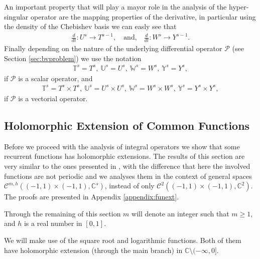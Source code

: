 \documentclass{article}
\newcommand{\IC}{{\mathbb C}}
\newcommand{\IU}{{\mathbb U}}
\newcommand{\IT}{{\mathbb T}}
\newcommand{\IW}{{\mathbb W}}
\newcommand{\IY}{{\mathbb Y}}
\newcommand{\cmspace}[3]{\mathcal{C}^{#1} \left( #2, #3 \right)}
\newcommand{\cmspaceh}[4]{\mathcal{C}^{#1,#2} \left( #3, #4 \right)}
\newcommand{\cP}{\mathcal{P}}
\newcommand{\iinterv}{(-1,1)\times(-1,1)}
\begin{document}
An important property that will play a mayor role in the analysis of the hyper-singular operator are the mapping properties of the derivative, in particular using the density of the Chebishev basis we can easly see that 
\begin{align}
\label{eq:devprop}
\frac{d}{dt} : U^s \rightarrow T^{s-1}, \quad \text{and,} \quad 
\frac{d}{dt} : W^s \rightarrow Y^{s-1}.
\end{align}
Finally depending on the nature of the underlying differential operator $\cP$ (see Section \ref{sec:bvproblem}) we use the notation 
\begin{align*}
\IT^s = T^s,\ \IU^s = U^s, \ \IW^s = W^s, \ \IY^s = Y^s,
\end{align*}
if $\cP$ is a scalar operator, and 
\begin{align*}
\IT^s = T^s \times T^s,\ \IU^s = U^s \times U^s, \ \IW^s = W^s \times W^s, \ \IY^s = Y^s \times Y^s,
\end{align*}
if $\cP$ is a vectorial operator.
\subsection{Holomorphic Extension of Common Functions}
\label{sec:funext}
Before we proceed with the analysis of integral operators we show that some recurrent functions has holomorphic extensions. The results of this section are very similar to the ones presented  in \cite{Henriquez2021}, with the difference that here the involved functions are not periodic and we analyses them in the context of general spaces $\cmspaceh{m}{h}{\iinterv}{\IC^s}$, instead of only $\cmspace{2}{\iinterv}{\IC^2}$. The proofs are presented in Appendix \ref{appendix:funext}.

Through the remaining of this section $m$ will denote an integer such that $m\geq 1$, and $h$ is a real number in $[0,1]$.

We will make use of the square root and logarithmic functions. Both of them have holomorphic extension (through the main branch) in $\IC \setminus (-\infty,0]$.
\end{document}
